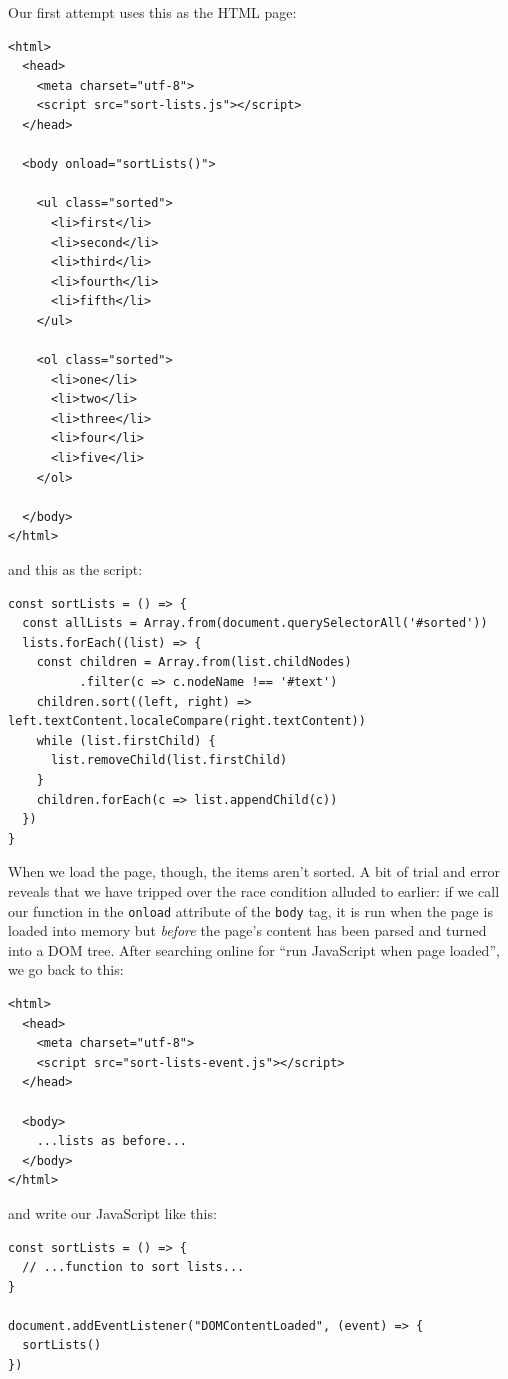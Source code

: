 Our first attempt uses this as the HTML page:

\begin{verbatim}
<html>
  <head>
    <meta charset="utf-8">
    <script src="sort-lists.js"></script>
  </head>

  <body onload="sortLists()">

    <ul class="sorted">
      <li>first</li>
      <li>second</li>
      <li>third</li>
      <li>fourth</li>
      <li>fifth</li>
    </ul>

    <ol class="sorted">
      <li>one</li>
      <li>two</li>
      <li>three</li>
      <li>four</li>
      <li>five</li>
    </ol>

  </body>
</html>
\end{verbatim}

and this as the script:

\begin{verbatim}
const sortLists = () => {
  const allLists = Array.from(document.querySelectorAll('#sorted'))
  lists.forEach((list) => {
    const children = Array.from(list.childNodes)
          .filter(c => c.nodeName !== '#text')
    children.sort((left, right) => left.textContent.localeCompare(right.textContent))
    while (list.firstChild) {
      list.removeChild(list.firstChild)
    }
    children.forEach(c => list.appendChild(c))
  })
}
\end{verbatim}

When we load the page, though, the items aren't sorted. A bit of trial
and error reveals that we have tripped over the race condition alluded
to earlier: if we call our function in the \texttt{onload} attribute of
the \texttt{body} tag, it is run when the page is loaded into memory but
\emph{before} the page's content has been parsed and turned into a DOM
tree. After searching online for ``run JavaScript when page loaded'', we
go back to this:

\begin{verbatim}
<html>
  <head>
    <meta charset="utf-8">
    <script src="sort-lists-event.js"></script>
  </head>

  <body>
    ...lists as before...
  </body>
</html>
\end{verbatim}

and write our JavaScript like this:

\begin{verbatim}
const sortLists = () => {
  // ...function to sort lists...
}

document.addEventListener("DOMContentLoaded", (event) => {
  sortLists()
})
\end{verbatim}

